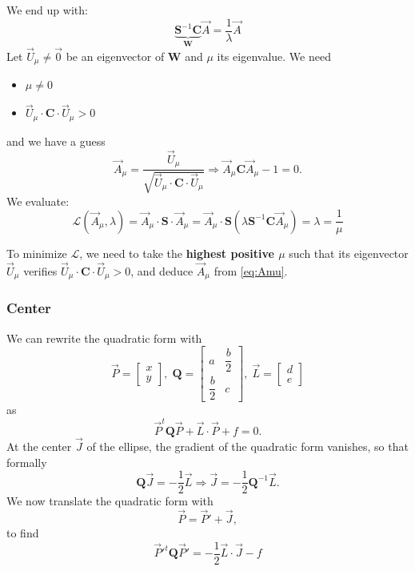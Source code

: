 \documentclass[aps,12pt]{revtex4}
\begin{document}
We end up with:
\begin{equation}
	\underbrace{\bm{S}^{-1} \bm{C}}_{\bm{W}} \vec{A} = \dfrac{1}{\lambda} \vec{A}
\end{equation}
Let $\vec{U}_\mu\not=\vec{0}$ be an eigenvector of $\bm{W}$ and $\mu$ its eigenvalue.
We need
\begin{itemize}
\item $\mu\not=0$
\item $\vec{U}_\mu\cdot\bm{C}\cdot\vec{U}_\mu>0$
\end{itemize}
and we have a guess
\begin{equation}
\label{eq:Amu}
	\vec{A}_\mu = \dfrac{ \vec{U}_\mu}{\sqrt{\vec{U}_\mu\cdot\bm{C}\cdot\vec{U}_\mu}} \Rightarrow \vec{A}_\mu \bm{C} \vec{A}_\mu-1 = 0.
\end{equation}
We evaluate:
\begin{equation}
\mathcal{L}(\vec{A}_\mu,\lambda) = \vec{A}_\mu \cdot \bm{S} \cdot \vec{A}_\mu 
= \vec{A}_\mu \cdot \bm{S} \left( \lambda \bm{S}^{-1} \bm{C} \vec{A}_\mu \right) = \lambda = \dfrac{1}{\mu}
\end{equation}

To minimize $\mathcal{L}$, we need to take the \textbf{highest positive $\mu$} such that its eigenvector $\vec{U}_\mu$ verifies
 $\vec{U}_\mu\cdot\bm{C}\cdot\vec{U}_\mu>0$, and deduce $\vec{A}_\mu$ from \eqref{eq:Amu}.

\subsubsection{Center}
We can rewrite the quadratic form with
\begin{equation}
	\vec{P} = \begin{bmatrix}
		x\\
		y
		\end{bmatrix},
		\;
		\bm{Q} = \begin{bmatrix}
		a & \dfrac{b}{2}\\
		\dfrac{b}{2} & c
		\end{bmatrix},\;
		\vec{L} = \begin{bmatrix}
		d\\
		e
		\end{bmatrix}
\end{equation}
as
\begin{equation}
	\vec{P}^t \bm{Q} \vec{P} + \vec{L}\cdot\vec{P} + f = 0.
\end{equation}
At the center $\vec{J}$ of the ellipse, the gradient of the quadratic form 
vanishes, so that formally
\begin{equation}
	\bm{Q}\vec{J} = -\dfrac{1}{2}\vec{L} \Rightarrow \vec{J} = -\dfrac{1}{2} \bm{Q}^{-1} \vec{L}.
\end{equation}
We now translate the quadratic form with
\begin{equation}
	\vec{P} = \vec{P}' + \vec{J},
\end{equation}
to find
\begin{equation}
	\vec{P}'^t \bm{Q} \vec{P}'= - \dfrac{1}{2} \vec{L}\cdot\vec{J} - f
\end{equation}

 
\end{document}
